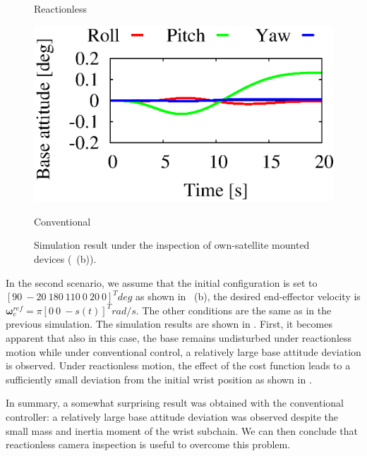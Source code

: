 \begin{figure}[t]
\begin{minipage}[h]{0.40\linewidth}
    \footnotesize\par{\hspace{8mm}\vspace{-2mm}Reactionless}
  \end{minipage}
  \begin{minipage}[h]{0.40\linewidth}
    \centering
    \includegraphics[width=1.0\linewidth]{fig/chapter4/inspection/case2/CONV/X02_Base_Orientation.eps}
    \footnotesize\par{\hspace{8mm}\vspace{-2mm}Conventional}
  \end{minipage}
  \vspace{1em}
  \caption{Simulation result under the inspection of own-satellite mounted devices (~(b)).}
  \label{fig:RES_INS2}
\end{figure}
%
In the second scenario, 
we assume that the initial configuration is set to $[90~-20~180~110~0~20~0]^{T}\unit{deg}$ as shown in ~(b),
the desired end-effector velocity is $\bm{\omega}_{e}^{ref} = \pi[0~0~-s(t)]^{T}\unit{rad/s}$.
The other conditions are the same as in the previous simulation.
The simulation results are shown in .
First, it becomes apparent that also in this case, the base remains undisturbed under reactionless motion
while under conventional control,  a relatively large base attitude deviation is observed. 
Under reactionless motion, the effect of the cost function leads to a sufficiently small deviation from
the initial wrist position as shown in .

In summary, a somewhat surprising result was obtained with the conventional controller:
a relatively large base attitude deviation was  observed despite the small mass and inertia moment 
of the wrist subchain. We can then conclude that reactionless camera inspection is useful  
to overcome this problem.

